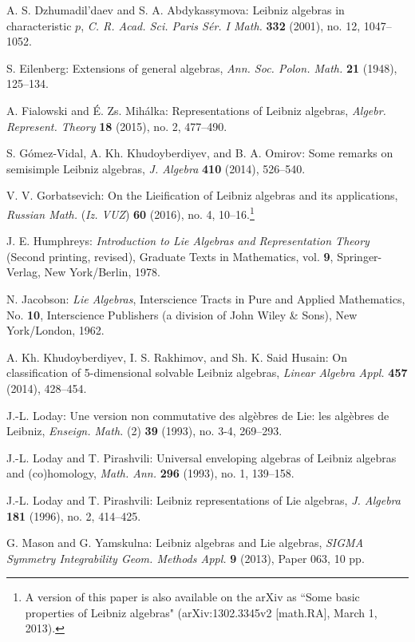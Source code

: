 \documentclass{amsart}
\numberwithin{equation}{section}
\begin{document}
\begin{thebibliography}{99}
A. S. Dzhumadil'daev and S. A. Abdykassymova:
Leibniz algebras in characteristic $p$,
{\it C. R. Acad. Sci. Paris S\'er. I Math.\/} {\bf 332} (2001), no. 12, 1047--1052.

S. Eilenberg:
Extensions of general algebras,
{\it Ann. Soc. Polon. Math.\/} {\bf 21} (1948), 125--134.

A. Fialowski and \'E. Zs. Mih\'alka:
Representations of Leibniz algebras,
{\it Algebr. Represent. Theory\/} {\bf 18} (2015), no. 2, 477--490.

S. G\'omez-Vidal, A. Kh. Khudoyberdiyev, and B. A. Omirov:
Some remarks on semisimple Leibniz algebras,
{\it J. Algebra\/} {\bf 410} (2014), 526--540.

V. V. Gorbatsevich:
On the Lieification of Leibniz algebras and its applications,
{\it Russian Math.\/} ({\it Iz. VUZ\/}) {\bf 60} (2016), no. 4, 10--16.\footnote{A version
of this paper is also available on the arXiv as ``Some basic properties of Leibniz algebras"
(arXiv:1302.3345v2 [math.RA], March 1, 2013).}

J. E. Humphreys:
{\it Introduction to Lie Algebras and Representation Theory\/} (Second printing, revised),
Graduate Texts in Mathematics, vol. {\bf 9},
Springer-Verlag, New York/Berlin, 1978.

N. Jacobson: {\it Lie Algebras\/},
Interscience Tracts in Pure and Applied Mathematics, No. {\bf 10},
Interscience Publishers (a division of John Wiley \& Sons), New York/London, 1962.

A. Kh. Khudoyberdiyev, I. S. Rakhimov, and Sh. K. Said Husain:
On classification of 5-dimensional solvable Leibniz algebras,
{\it Linear Algebra Appl.\/} {\bf 457} (2014), 428--454.

J.-L. Loday:
Une version non commutative des alg\`ebres de Lie: les alg\`ebres de Leibniz,
{\it Enseign. Math.\/} (2) {\bf 39} (1993), no. 3-4, 269--293.

J.-L. Loday and T. Pirashvili:
Universal enveloping algebras of Leibniz algebras and (co)homology,
{\it Math. Ann.\/} {\bf 296} (1993), no. 1, 139--158.

J.-L. Loday and T. Pirashvili:
Leibniz representations of Lie algebras,
{\it J. Algebra\/} {\bf 181} (1996), no. 2, 414--425.

G. Mason and G. Yamskulna:
Leibniz algebras and Lie algebras,
{\it SIGMA Symmetry Integrability Geom. Methods Appl.\/} {\bf 9} (2013), Paper 063, 10 pp.


\end{thebibliography}
\end{document}

